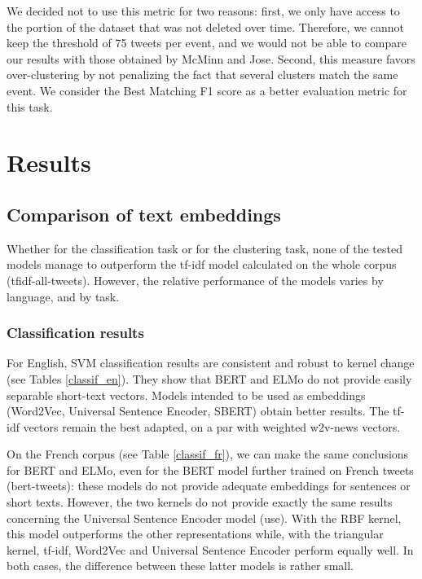 We decided not to use this metric for two reasons: first, we only have access to the portion of the \citet{mcminn_building_2013} dataset that was not deleted over time. Therefore, we cannot keep the threshold of 75 tweets per event, and we would not be able to compare our results with those obtained by McMinn and Jose. Second, this measure favors over-clustering by not penalizing the fact that several clusters match the same event. We consider the Best Matching F1 score as a better evaluation metric for this task.


\section{Results}
\label{Sec: results}

\subsection{Comparison of text embeddings}
\label{Subsec: text embeddings}
Whether for the classification task or for the clustering task, none of the tested models manage to outperform the tf-idf model calculated on the whole corpus (tfidf-all-tweets). However, the relative performance of the models varies by language, and by task.

\subsubsection{Classification results}

For English, SVM classification results are consistent and robust to kernel change (see Tables \ref{classif_en}). They show that BERT and ELMo do not provide easily separable short-text vectors. Models intended to be used as embeddings (Word2Vec, Universal Sentence Encoder, SBERT) obtain better results. The tf-idf vectors remain the best adapted,  on a par with weighted w2v-news vectors. 

On the French corpus (see Table \ref{classif_fr}), we can make the same conclusions for BERT and ELMo, even for the BERT model further trained on French tweets (bert-tweets): these models do not provide adequate embeddings for sentences or short texts. However, the two kernels do not provide exactly the same results concerning the Universal Sentence Encoder model (use). With the RBF kernel, this model outperforms the other representations
while, with the triangular kernel, tf-idf, Word2Vec and Universal Sentence Encoder perform equally well. In both cases, the difference between these latter models is rather small.

